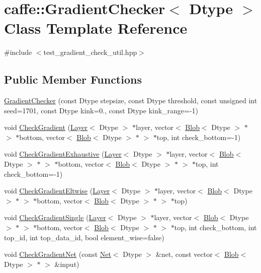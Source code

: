 \hypertarget{classcaffe_1_1_gradient_checker}{\section{caffe\+:\+:Gradient\+Checker$<$ Dtype $>$ Class Template Reference}
\label{classcaffe_1_1_gradient_checker}
}


{\ttfamily \#include $<$test\+\_\+gradient\+\_\+check\+\_\+util.\+hpp$>$}

\subsection*{Public Member Functions}
\begin{DoxyCompactItemize}
\item 
\hyperlink{classcaffe_1_1_gradient_checker_a3669e5cf7ba11ee6858f628f7409fbdc}{Gradient\+Checker} (const Dtype stepsize, const Dtype threshold, const unsigned int seed=1701, const Dtype kink=0., const Dtype kink\+\_\+range=-\/1)
\item 
void \hyperlink{classcaffe_1_1_gradient_checker_acc5d8d420f39161eabcef0ba6985d2bb}{Check\+Gradient} (\hyperlink{classcaffe_1_1_layer}{Layer}$<$ Dtype $>$ $\ast$layer, vector$<$ \hyperlink{classcaffe_1_1_blob}{Blob}$<$ Dtype $>$ $\ast$ $>$ $\ast$bottom, vector$<$ \hyperlink{classcaffe_1_1_blob}{Blob}$<$ Dtype $>$ $\ast$ $>$ $\ast$top, int check\+\_\+bottom=-\/1)
\item 
void \hyperlink{classcaffe_1_1_gradient_checker_ac54a3abf29ba9fdec8c638b9d64bafda}{Check\+Gradient\+Exhaustive} (\hyperlink{classcaffe_1_1_layer}{Layer}$<$ Dtype $>$ $\ast$layer, vector$<$ \hyperlink{classcaffe_1_1_blob}{Blob}$<$ Dtype $>$ $\ast$ $>$ $\ast$bottom, vector$<$ \hyperlink{classcaffe_1_1_blob}{Blob}$<$ Dtype $>$ $\ast$ $>$ $\ast$top, int check\+\_\+bottom=-\/1)
\item 
void \hyperlink{classcaffe_1_1_gradient_checker_af91c345fb21a8ab832678f762a5c514b}{Check\+Gradient\+Eltwise} (\hyperlink{classcaffe_1_1_layer}{Layer}$<$ Dtype $>$ $\ast$layer, vector$<$ \hyperlink{classcaffe_1_1_blob}{Blob}$<$ Dtype $>$ $\ast$ $>$ $\ast$bottom, vector$<$ \hyperlink{classcaffe_1_1_blob}{Blob}$<$ Dtype $>$ $\ast$ $>$ $\ast$top)
\item 
void \hyperlink{classcaffe_1_1_gradient_checker_a29485303acb43364b6070db03dde91d6}{Check\+Gradient\+Single} (\hyperlink{classcaffe_1_1_layer}{Layer}$<$ Dtype $>$ $\ast$layer, vector$<$ \hyperlink{classcaffe_1_1_blob}{Blob}$<$ Dtype $>$ $\ast$ $>$ $\ast$bottom, vector$<$ \hyperlink{classcaffe_1_1_blob}{Blob}$<$ Dtype $>$ $\ast$ $>$ $\ast$top, int check\+\_\+bottom, int top\+\_\+id, int top\+\_\+data\+\_\+id, bool element\+\_\+wise=false)
\item 
void \hyperlink{classcaffe_1_1_gradient_checker_added2b064b65c97e1e5fdf93839d2d87}{Check\+Gradient\+Net} (const \hyperlink{classcaffe_1_1_net}{Net}$<$ Dtype $>$ \&net, const vector$<$ \hyperlink{classcaffe_1_1_blob}{Blob}$<$ Dtype $>$ $\ast$ $>$ \&input)
\end{DoxyCompactItemize}
